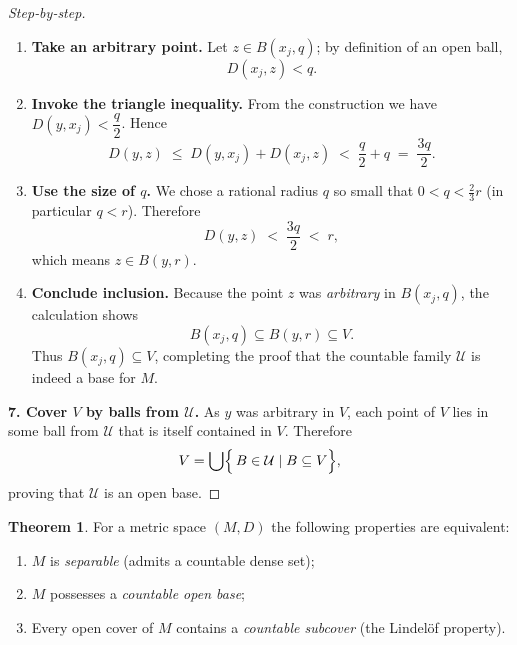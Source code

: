 \documentclass[12pt]{article}
\theoremstyle{definition} %
\newtheorem{theorem}{Theorem}
\theoremstyle{plain} %
\begin{document}
\begin{proof}[Step‑by‑step]
\begin{enumerate}
  \item \textbf{Take an arbitrary point.}  
        Let \(z\in B(x_j,q)\); by definition of an open ball,
        \[
            D(x_j,z)<q.
        \]

  \item \textbf{Invoke the triangle inequality.}  
        From the construction we have \(D(y,x_j)<\dfrac{q}{2}\).  
        Hence
        \[
            D(y,z)\;\le\;D(y,x_j)+D(x_j,z)
                    \;<\;\frac{q}{2}+q
                    \;=\;\frac{3q}{2}.
        \]

  \item \textbf{Use the size of \(q\).}  
        We chose a rational radius \(q\) so small that \(0<q<\tfrac{2}{3}r\)
        (in particular \(q<r\)).  Therefore
        \[
            D(y,z)\;<\;\frac{3q}{2}\;<\;r,
        \]
        which means \(z\in B(y,r)\).

  \item \textbf{Conclude inclusion.}  
        Because the point \(z\) was \emph{arbitrary} in \(B(x_j,q)\), the
        calculation shows
        \[
            B(x_j,q)\subseteq B(y,r)\subseteq V.
        \]
        Thus \(B(x_j,q)\subseteq V\), completing the proof that the
        countable family \(\mathcal{U}\) is indeed a base for \(M\).
\end{enumerate}

    \medskip
    \textbf{7.  Cover $V$ by balls from $\mathcal U$.}\;
    As $y$ was arbitrary in $V$, each point of $V$ lies in some ball
    from $\mathcal U$ that is itself contained in $V$.  
    Therefore
    \[
        V=\bigcup\Bigl\{\,B\in\mathcal U \mid B\subseteq V\Bigr\},
    \]
    proving that $\mathcal U$ is an open base.
\end{proof}

\begin{theorem}\label{thm:sep_base_lindelof}
  For a metric space $(M,D)$ the following properties are equivalent:
  \begin{enumerate}[label=\textup{(\alph*)}]
      \item $M$ is \emph{separable} (admits a countable dense set);
      \item $M$ possesses a \emph{countable open base};
      \item Every open cover of $M$ contains a \emph{countable subcover}
            (the Lindelöf property).
  \end{enumerate}
\end{theorem}
\end{document}
